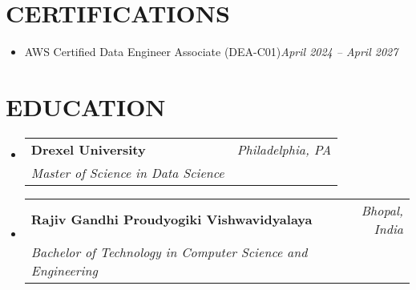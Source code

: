 \documentclass[letterpaper,10pt]{article}
\makeatletter
\newcommand{\resumeItem}[1]{
  \item\small{
    {#1 \vspace{-1.5pt}}
  }
}
\newcommand{\resumeSubheading}[4]{
  \vspace{-2pt}\item
    \begin{tabular*}{0.97\textwidth}[t]{l@{\extracolsep{\fill}}r}
      \textbf{#1} & #2 \\
      \textit{\small#3} & \textit{\small #4} \\
    \end{tabular*}\vspace{-5pt}
}
\newcommand{\resumeSubHeadingListStart}{\begin{itemize}[leftmargin=0.15in, label={}]}
\newcommand{\resumeSubHeadingListEnd}{\end{itemize}}
\makeatother
\begin{document}
\section{CERTIFICATIONS}
\resumeSubHeadingListStart
    \resumeItem{AWS Certified Data Engineer Associate (DEA-C01)\hfill \textit{April 2024 -- April 2027}}
\resumeSubHeadingListEnd

\section{EDUCATION}
\resumeSubHeadingListStart
    \resumeSubheading
      {Drexel University}{\textit{Philadelphia, PA}}
      {Master of Science in Data Science}{}
    \resumeSubheading
      {Rajiv Gandhi Proudyogiki Vishwavidyalaya}{\textit{Bhopal, India}}
      {Bachelor of Technology in Computer Science and Engineering}{}
\resumeSubHeadingListEnd
\end{document}

